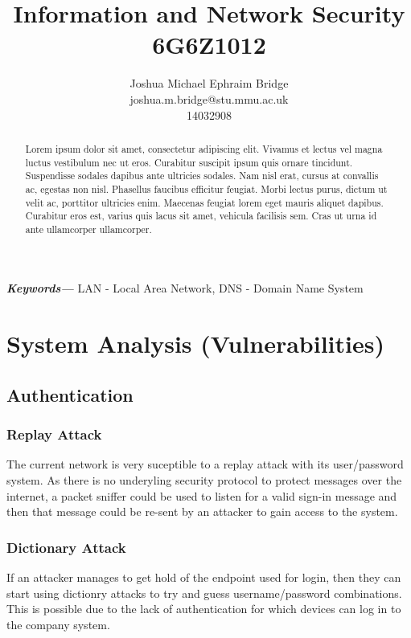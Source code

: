 \documentclass[11pt]{article}
\title{\vspace{2cm}\textbf{Information and Network Security}\\6G6Z1012}
\author{Joshua Michael Ephraim Bridge\\joshua.m.bridge@stu.mmu.ac.uk\\14032908}
\providecommand{\keywords}[1] {
  \small
  \textbf{\textit{Keywords---}} #1
}
\begin{document}
  \maketitle

  \vspace{1cm}

  \begin{abstract}
    Lorem ipsum dolor sit amet, consectetur adipiscing elit. Vivamus et lectus vel magna luctus vestibulum nec ut eros. Curabitur suscipit ipsum quis ornare tincidunt. Suspendisse sodales dapibus ante ultricies sodales. Nam nisl erat, cursus at convallis ac, egestas non nisl. Phasellus faucibus efficitur feugiat. Morbi lectus purus, dictum ut velit ac, porttitor ultricies enim. Maecenas feugiat lorem eget mauris aliquet dapibus. Curabitur eros est, varius quis lacus sit amet, vehicula facilisis sem. Cras ut urna id ante ullamcorper ullamcorper.
  \end{abstract}

  \vspace{0.5cm}

  \keywords{LAN - Local Area Network, DNS - Domain Name System}

  \newpage


  \section{System Analysis (Vulnerabilities)}
    \subsection{Authentication}
      \subsubsection{Replay Attack}
        The current network is very suceptible to a replay attack with its user/password system. As there is no underyling security protocol to protect messages over the internet, a packet sniffer could be used to listen for a valid sign-in message and then that message could be re-sent by an attacker to gain access to the system.
      \subsubsection{Dictionary Attack}
        If an attacker manages to get hold of the endpoint used for login, then they can start using dictionry attacks to try and guess username/password combinations. This is possible due to the lack of authentication for which devices can log in to the company system.
\end{document}
